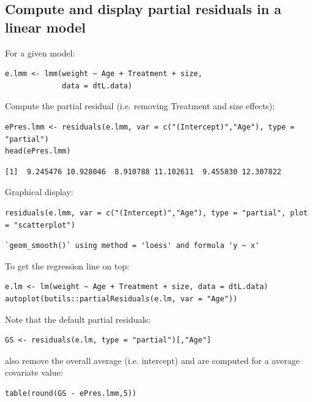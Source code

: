 \documentclass{article}
\begin{document}
\subsection{Compute and display partial residuals in a linear model}
\label{sec:orgee62cfa}

For a given model:
\lstset{language=r,label= ,caption= ,captionpos=b,numbers=none}
\begin{lstlisting}
e.lmm <- lmm(weight ~ Age + Treatment + size,
             data = dtL.data)
\end{lstlisting}

Compute the partial residual (i.e. removing Treatment and size effects):
\lstset{language=r,label= ,caption= ,captionpos=b,numbers=none}
\begin{lstlisting}
ePres.lmm <- residuals(e.lmm, var = c("(Intercept)","Age"), type = "partial")
head(ePres.lmm)
\end{lstlisting}

\begin{verbatim}
[1]  9.245476 10.928046  8.910788 11.102611  9.455830 12.307822
\end{verbatim}


Graphical display:
\lstset{language=r,label= ,caption= ,captionpos=b,numbers=none}
\begin{lstlisting}
residuals(e.lmm, var = c("(Intercept)","Age"), type = "partial", plot = "scatterplot")
\end{lstlisting}

\begin{verbatim}
`geom_smooth()` using method = 'loess' and formula 'y ~ x'
\end{verbatim}


To get the regression line on top:
\lstset{language=r,label= ,caption= ,captionpos=b,numbers=none}
\begin{lstlisting}
e.lm <- lm(weight ~ Age + Treatment + size, data = dtL.data)
autoplot(butils::partialResiduals(e.lm, var = "Age"))
\end{lstlisting}

Note that the default partial residuals:
\lstset{language=r,label= ,caption= ,captionpos=b,numbers=none}
\begin{lstlisting}
GS <- residuals(e.lm, type = "partial")[,"Age"]
\end{lstlisting}

also remove the overall average (i.e. intercept) and are computed for
a average covariate value:
\lstset{language=r,label= ,caption= ,captionpos=b,numbers=none}
\begin{lstlisting}
table(round(GS - ePres.lmm,5))
\end{lstlisting}
\end{document}
